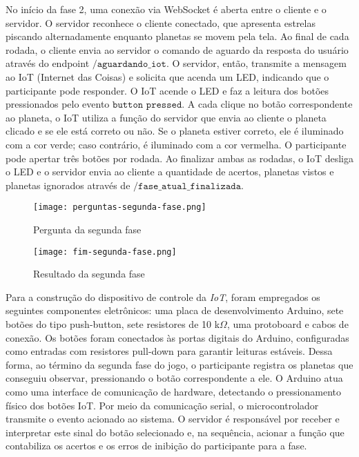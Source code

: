No início da fase 2, uma conexão via WebSocket é aberta entre o cliente e o servidor. O servidor reconhece o cliente conectado, que apresenta estrelas piscando alternadamente enquanto planetas se movem pela tela. Ao final de cada rodada, o cliente envia ao servidor o comando de aguardo da resposta do usuário através do endpoint $\texttt{/aguardando\_iot}$. O servidor, então, transmite a mensagem ao IoT (Internet das Coisas) e solicita que acenda um LED, indicando que o participante pode responder. O IoT acende o LED e faz a leitura dos botões pressionados pelo evento $\texttt{button pressed}$. A cada clique no botão correspondente ao planeta, o IoT utiliza a função do servidor que envia ao cliente o planeta clicado e se ele está correto ou não. Se o planeta estiver correto, ele é iluminado com a cor verde; caso contrário, é iluminado com a cor vermelha. O participante pode apertar três botões por rodada. Ao finalizar ambas as rodadas, o IoT desliga o LED e o servidor envia ao cliente a quantidade de acertos, planetas vistos e planetas ignorados através de $\texttt{/fase\_atual\_finalizada}$.

\begin{figure}[H]
    \centering
    \caption{Pergunta da segunda fase}%
    \label{fig:perguntas-segunda-fase}
    \texttt{[image: perguntas-segunda-fase.png]}%
\end{figure}

\begin{figure}[H]
    \centering
    \caption{Resultado da segunda fase}%
    \label{fig:fim-segunda-fase}
    \texttt{[image: fim-segunda-fase.png]}%
\end{figure}

Para a construção do dispositivo de controle da \textit{IoT}, foram empregados os seguintes componentes eletrônicos: uma placa de desenvolvimento Arduino, sete botões do tipo push-button, sete resistores de 10 k$\Omega$, uma protoboard e cabos de conexão. Os botões foram conectados às portas digitais do Arduino, configuradas como entradas com resistores pull-down para garantir leituras estáveis. Dessa forma, ao término da segunda fase do jogo, o participante registra os planetas que conseguiu observar, pressionando o botão correspondente a ele. O Arduino atua como uma interface de comunicação de hardware, detectando o pressionamento físico dos botões IoT. Por meio da comunicação serial, o microcontrolador transmite o evento acionado ao sistema. O servidor é responsável por receber e interpretar este sinal do botão selecionado e, na sequência, acionar a função que contabiliza os acertos e os erros de inibição do participante para a fase.


